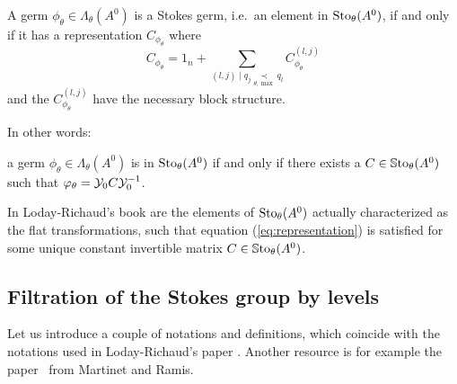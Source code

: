 \begin{cor}
  A germ $\phi_\theta\in\Lambda_\theta(A^0)$ is a Stokes germ, i.e.\ an element
  in $\operatorname{Sto}_\theta(A^0)$, if and only if it has a representation
  $C_{\phi_\theta}$ where
  \[
    C_{\phi_\theta}=1_n +
    \sum_{(l,j)\mid q_j\underset{\theta,\max}{\prec}q_l}
    C_{\phi_\theta}^{(l,j)}
  \]
  and the $C_{\phi_\theta}^{(l,j)}$ have the necessary block structure.

  In other words:
  \begin{einr}
    a germ $\phi_\theta\in\Lambda_\theta(A^0)$ is in $\operatorname{Sto}_\theta(A^0)$ if and
    only if there exists a $C\in\operatorname{\mathbb{S}to}_\theta(A^0)$ such that
    $\varphi_\theta=\mathcal{Y}_{0}C\mathcal{Y}_{0}^{-1}$.
  \end{einr}
  \begin{s-rem}
    In Loday-Richaud's book \cite[78]{Loday2014} are the elements of
    $\operatorname{Sto}_\theta(A^0)$ actually characterized as the flat transformations, such
    that equation (\ref{eq:representation}) is satisfied for some unique
    constant invertible matrix $C\in\operatorname{\mathbb{S}to}_\theta(A^0)$.
  \end{s-rem}
\end{cor}

\subsection{Filtration of the Stokes group by levels}
Let us introduce a couple of notations and definitions, which coincide with the
notations used in Loday-Richaud's paper \cite{Loday1994}.
Another resource is for example the paper~\cite[362f]{Martinet1991} from
Martinet and Ramis.

